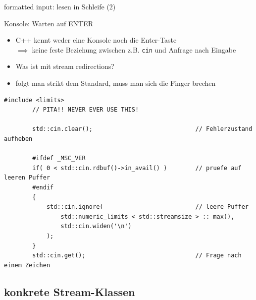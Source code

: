 \begin{frame}[t]{formatted input: lesen in Schleife (2)}
	\onslide*<+> {  }
	\onslide*<+> {  }
	\onslide<+> {  }
\end{frame}

\begin{frame}[fragile]{Konsole: Warten auf ENTER}
	\footnotesize
	\begin{itemize}
		\item C++ kennt weder eine Konsole noch die Enter-Taste	\\
			$\implies$ keine feste Beziehung zwischen z.B. \texttt{cin} und Anfrage nach Eingabe
		\item Was ist mit stream redirections?
		\item folgt man strikt dem Standard, muss man sich die Finger brechen
	\end{itemize}
	
	\pause
	
	\begin{lstlisting}[basicstyle=\scriptsize]
		#include <limits>
		// PITA!! NEVER EVER USE THIS!
		
		std::cin.clear();                             // Fehlerzustand aufheben
		
		#ifdef _MSC_VER
		if( 0 < std::cin.rdbuf()->in_avail() )        // pruefe auf leeren Puffer
		#endif
		{
		    std::cin.ignore(                          // leere Puffer
		        std::numeric_limits < std::streamsize > :: max(),
		        std::cin.widen('\n')
		    );
		}
		std::cin.get();                               // Frage nach einem Zeichen
	\end{lstlisting}
\end{frame}


\subsection{konkrete Stream-Klassen}

